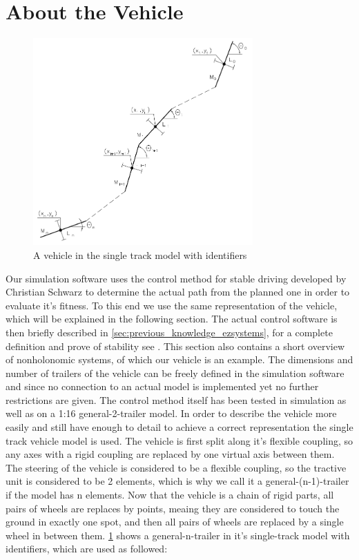\section{About the Vehicle}
\label{sec:previous_knowledge_vehicle}

\begin{figure}[t]
\centering
\includegraphics[width=0.75\textwidth]{./Chapters/Figures/single-track-model.png}
\caption{A vehicle in the single track model with identifiers\label{pic:single-track-model}}
\end{figure}


Our simulation software uses the control method for stable driving developed by Christian Schwarz to determine the actual path from the planned one in order to evaluate it's fitness. To this end we use the same representation of the vehicle, which will be explained in the following section. The actual control software is then briefly described in \ref{sec:previous_knowledge_ezsystems}, for a complete definition and prove of stability see \cite{12}. This section also contains a short overview of nonholonomic systems, of which our vehicle is an example.
The dimensions and number of trailers of the vehicle can be freely defined in the simulation software and since no connection to an actual model is implemented yet no further restrictions are given. The control method itself has been tested in simulation as well as on a 1:16 general-2-trailer model. In order to describe the vehicle more easily and still have enough to detail to achieve a correct representation the single track vehicle model is used.\cite{27} The vehicle is first split along it's flexible coupling, so any axes with a rigid coupling are replaced by one virtual axis between them. The steering of the vehicle is considered to be a flexible coupling, so the tractive unit is considered to be 2 elements, which is why we call it a general-(n-1)-trailer if the model has n elements. Now that the vehicle is a chain of rigid parts, all pairs of wheels are replaces by points, meaing they are considered to touch the ground in exactly one spot, and then all pairs of wheels are replaced by a single wheel in between them. \ref{pic:single-track-model} shows a general-n-trailer in it's single-track model with identifiers, which are used as followed:

